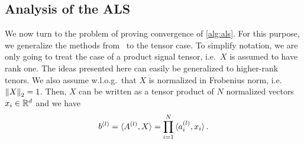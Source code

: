 \subsection{Analysis of the ALS}%
\label{sub:ana}

We now turn to the problem of proving convergence of \cref{alg:als}.
For this purpose, we generalize the methods from~\cite{Zhong} to the tensor case.
To simplify notation, we are only going to treat the case of a product signal tensor, i.e.\ $X$ is assumed to have rank one.
The ideas presented here can easily be generalized to higher-rank tenors.
We also assume w.l.o.g.\ that $X$ is normalized in Frobenius norm, i.e.\ ${\Vert X\Vert}_2 = 1$.
Then, $X$ can be written as a tensor product of $N$ normalized vectors $x_i \in {\mathbb{R}}^d$ and we have
\[
  b^{(l)} = \braket{A^{(l)}, X} = \prod_{i=1}^N \braket{a^{(l)}_i, x_i}.
  \label{eq:ana.b_as_product}
\]

